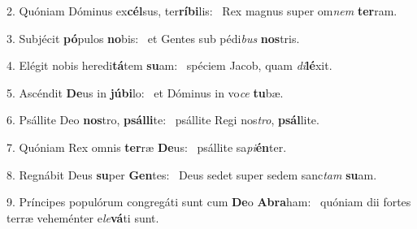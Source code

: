 2. Quóniam Dóminus ex\textbf{cél}sus, ter\textbf{rí}\textbf{bi}lis: \ast\  Rex magnus super om\textit{nem} \textbf{ter}ram.\

3. Subjécit \textbf{pó}pulos \textbf{no}bis: \ast\  et Gentes sub pédi\textit{bus} \textbf{nos}tris.\

4. Elégit nobis heredi\textbf{tá}tem \textbf{su}am: \ast\  spéciem Jacob, quam \textit{di}\textbf{lé}xit.\

5. Ascéndit \textbf{De}us in \textbf{jú}\textbf{bi}lo: \ast\  et Dóminus in vo\textit{ce} \textbf{tu}bæ.\

6. Psállite Deo \textbf{nos}tro, \textbf{psál}\textbf{li}te: \ast\  psállite Regi nos\textit{tro}, \textbf{psál}lite.\

7. Quóniam Rex omnis \textbf{ter}ræ \textbf{De}us: \ast\  psállite sa\textit{pi}\textbf{én}ter.\

8. Regnábit Deus \textbf{su}per \textbf{Gen}tes: \ast\  Deus sedet super sedem sanc\textit{tam} \textbf{su}am.\

9. Príncipes populórum congregáti sunt cum \textbf{De}o \textbf{A}\textbf{bra}ham: \ast\  quóniam dii fortes terræ veheménter e\textit{le}\textbf{vá}ti sunt.\

